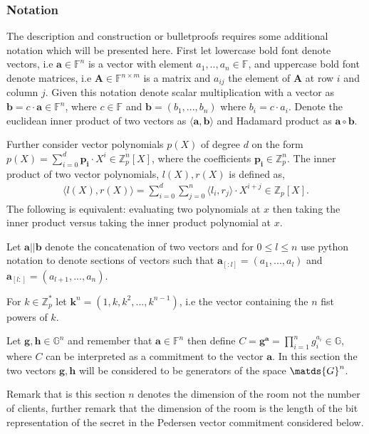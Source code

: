 \subsubsection*{Notation}
The description and construction or bulletproofs requires some additional notation which will be presented here. First let lowercase bold font denote vectors, i.e $\mathbf{a}\in\mathds{F}^n$ is a vector with element $a_1,..,a_n \in \mathds{F}$, and uppercase bold font denote matrices, i.e $\mathbf{A}\in\mathds{F}^{n\times m}$ is a matrix and $a_{ij}$ the element of $\mathbf{A}$ at row $i$ and column $j$. Given this notation denote scalar multiplication with a vector as $\mathbf{b}=c\cdot \mathbf{a}\in\mathds{F}^n$, where $c\in\mathds{F}$ and $\mathbf{b}=(b_1,...,b_n)$ where $b_i=c\cdot a_i$. Denote the euclidean inner product of two vectors as $\langle \mathbf{a},\mathbf{b}\rangle$ and Hadamard product as $\mathbf{a}\circ \mathbf{b}$.

Further consider vector polynomials $p(X)$ of degree $d$ on the form $p(X)=\sum_{i=0}^d \mathbf{p_i}\cdot X^i\in\mathds{Z}_p^n[X]$, where the coefficients $\mathbf{p_i}\in\mathds{Z}_p^n$. The inner product of two vector polynomials, $l(X),r(X)$ is defined as, 
\begin{align*}
    \langle l(X),r(X)\rangle = \sum_{i=0}^d\sum_{j=0}^n \langle l_i,r_j\rangle \cdot X^{i+j}\in\mathds{Z}_p[X].
\end{align*}
The following is equivalent: evaluating two polynomials at $x$ then taking the inner product versus taking the inner product polynomial at $x$.

Let $\mathbf{a}||\mathbf{b}$ denote the concatenation of two vectors and for $0\leq l \leq n$ use python notation to denote sections of vectors such that $\mathbf{a}_{[:l]} = (a_1,...,a_l)$ and $\mathbf{a}_{[l:]} = (a_{l+1},...,a_n)$. 

For $k\in\mathds{Z}_p^*$ let $\mathbf{k}^n=(1,k,k^2,...,k^{n-1})$, i.e the vector containing the $n$ fist powers of $k$. 

Let $\mathbf{g},\mathbf{h}\in\mathds{G}^n$ and remember that $\mathbf{a}\in\mathds{F}^n$ then define $C= \mathbf{g}^\mathbf{a} = \prod_{i=1}^ng_i^{a_i}\in\mathds{G}$, where $C$ can be interpreted as a commitment to the vector $\mathbf{a}$. In this section the two vectors $\mathbf{g},\mathbf{h}$ will be considered to be generators of the space $\matds{G}^n$.

Remark that is this section $n$ denotes the dimension of the room not the number of clients, further remark that the dimension of the room is the length of the bit representation of the secret in the Pedersen vector commitment considered below. 

